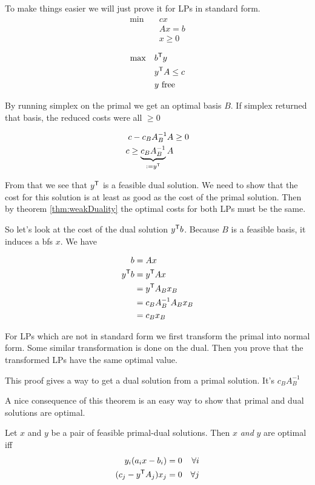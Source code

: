 \begin{pr} To make things easier we will just prove it for LPs in standard form.
\begin{align*}
\min \quad & cx\\
& Ax = b\\
&x\geq 0
\end{align*}

\begin{align*}
\max \quad &{b}^\text{\upshape \sffamily T}y\\
& {y}^\text{\upshape \sffamily T}A \leq c\\
& y \text{ free}
\end{align*}

By running simplex on the primal we get an optimal basis $B$. If simplex returned that basis, the reduced costs were all $\geq 0$

\begin{align*}
c-c_BA_B^{-1}A &\geq 0\\
c \geq \underbrace{c_BA_B^{-1}}_{:={y}^\text{\upshape \sffamily T}}A
\end{align*}

From that we see that ${y}^\text{\upshape \sffamily T}$ is a feasible dual solution. We need to show that the cost for this solution is at least as good as the cost of the primal solution. Then by theorem \ref{thm:weakDuality} the optimal costs for both LPs must be the same.

So let's look at the cost of the dual solution ${y}^\text{\upshape \sffamily T} b$. Because $B$ is a feasible basis, it induces a bfs $x$. We have

\begin{align*}
b &= Ax\\
{y}^\text{\upshape \sffamily T} b &= {y}^\text{\upshape \sffamily T} A x\\
 &={y}^\text{\upshape \sffamily T} A_B x_B\\
 &=c_B A_B^{-1}A_B x_B\\
 &=c_B x_B
 \end{align*}
 
 For LPs which are not in standard form we first transform the primal into normal form. Some similar transformation is done on the dual. Then you prove that the transformed LPs have the same optimal value.
\end{pr}

This proof gives a way to get a dual solution from a primal solution. It's $c_BA_B^{-1}$

A nice consequence of this theorem is an easy way to show that primal and dual solutions are optimal.

\begin{thm} Let $x$ and $y$ be a pair of feasible primal-dual solutions. Then $x$ \emph{and} $y$ are optimal iff
\begin{align*}
y_i(a_ix-b_i) = 0 && \forall i\\ 
(c_j - {y}^\text{\upshape \sffamily T}A_j)x_j =0 && \forall j
\end{align*}
\end{thm}

